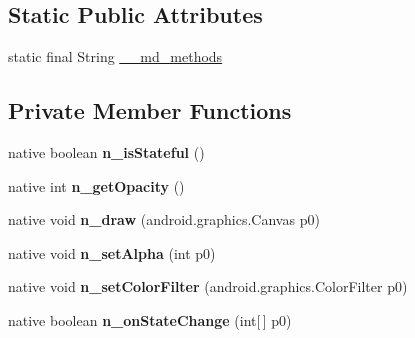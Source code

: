 \subsection*{Static Public Attributes}
\begin{DoxyCompactItemize}
\item 
static final String \hyperlink{classmd5b60ffeb829f638581ab2bb9b1a7f4f3f_1_1ButtonDrawable_aa04b94d1936232b4a6afd49d724c48c0}{\+\_\+\+\_\+md\+\_\+methods}
\end{DoxyCompactItemize}
\subsection*{Private Member Functions}
\begin{DoxyCompactItemize}
\item 
\mbox{\label{classmd5b60ffeb829f638581ab2bb9b1a7f4f3f_1_1ButtonDrawable_a36e2ba04f406e9f47a35fa82da0c994e}} 
native boolean {\bfseries n\+\_\+is\+Stateful} ()
\item 
\mbox{\label{classmd5b60ffeb829f638581ab2bb9b1a7f4f3f_1_1ButtonDrawable_a68a3c7ed19890b9d504b2c8fd1d7a9ac}} 
native int {\bfseries n\+\_\+get\+Opacity} ()
\item 
\mbox{\label{classmd5b60ffeb829f638581ab2bb9b1a7f4f3f_1_1ButtonDrawable_a7f82f0049266f99a0ba16b61059e7807}} 
native void {\bfseries n\+\_\+draw} (android.\+graphics.\+Canvas p0)
\item 
\mbox{\label{classmd5b60ffeb829f638581ab2bb9b1a7f4f3f_1_1ButtonDrawable_ab6c0d6640b641ff7d1e790113c1aee90}} 
native void {\bfseries n\+\_\+set\+Alpha} (int p0)
\item 
\mbox{\label{classmd5b60ffeb829f638581ab2bb9b1a7f4f3f_1_1ButtonDrawable_a611d0f00b4f853446cfaccf8130ac3ab}} 
native void {\bfseries n\+\_\+set\+Color\+Filter} (android.\+graphics.\+Color\+Filter p0)
\item 
\mbox{\label{classmd5b60ffeb829f638581ab2bb9b1a7f4f3f_1_1ButtonDrawable_a10ce7ebc986090cf1498d873b3bff7e4}} 
native boolean {\bfseries n\+\_\+on\+State\+Change} (int\mbox{[}$\,$\mbox{]} p0)
\end{DoxyCompactItemize}
